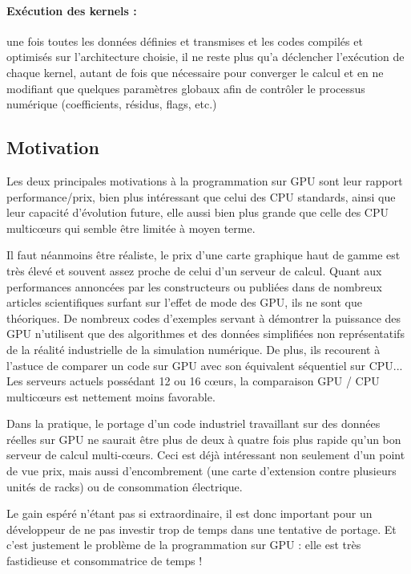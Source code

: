 \documentclass[a4paper,12pt]{article}
\begin{document}
\paragraph{Exécution des kernels :} une fois toutes les données définies et transmises et les codes compilés et optimisés sur l'architecture choisie, il ne reste plus qu'a déclencher l'exécution de chaque kernel, autant de fois que nécessaire pour converger le calcul et en ne modifiant que quelques paramètres globaux afin de contrôler le processus numérique (coefficients, résidus, flags, etc.)


\subsection{Motivation}
Les deux principales motivations à la programmation sur GPU sont leur rapport performance/prix, bien plus intéressant que celui des CPU standards, ainsi que leur capacité d'évolution future, elle aussi bien plus grande que celle des CPU multic\oe urs qui semble être limitée à moyen terme.

Il faut néanmoins être réaliste, le prix d'une carte graphique haut de gamme est très élevé et souvent assez proche de celui d'un serveur de calcul. Quant aux performances annoncées par les constructeurs ou publiées dans de nombreux articles scientifiques surfant sur l'effet de mode des GPU, ils ne sont que théoriques. De nombreux codes d'exemples servant à démontrer la puissance des GPU n'utilisent que des algorithmes et des données simplifiées non représentatifs de la réalité industrielle de la simulation numérique. De plus, ils recourent à l'astuce de comparer un code sur GPU avec son équivalent séquentiel sur CPU... Les serveurs actuels possédant 12 ou 16 c\oe urs, la comparaison GPU / CPU multic\oe urs est nettement moins favorable.

Dans la pratique, le portage d'un code industriel travaillant sur des données réelles sur GPU ne saurait être plus de deux à quatre fois plus rapide qu'un bon serveur de calcul multi-c\oe urs. Ceci est déjà intéressant non seulement d'un point de vue prix, mais aussi d'encombrement (une carte d'extension contre plusieurs unités de racks) ou de consommation électrique.

Le gain espéré n'étant pas si extraordinaire, il est donc important pour un développeur de ne pas investir trop de temps dans une tentative de portage. Et c'est justement le problème de la programmation sur GPU : elle est très fastidieuse et consommatrice de temps !
\end{document}

